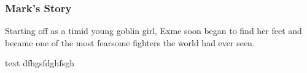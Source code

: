 \subsubsection{Mark's Story}

Starting off as a timid young goblin girl, Exme soon began to find her feet and became one of the most fearsome fighters the world had ever seen.  

\begin{DndSidebar}{text}
 dfhgsfdghfsgh
\end{DndSidebar}

\smallskip

\bigskip


\clearpage